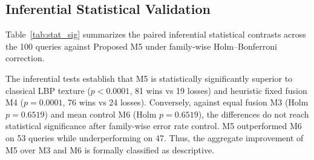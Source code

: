 \documentclass[pdflatex,sn-mathphys-num]{sn-jnl}
\renewenvironment{table}[1][]{%
  \begin{tableorg}[#1]%
  \centering
}{%
  \end{tableorg}%
}
\begin{document}
\subsection{Inferential Statistical Validation}
Table~\ref{tab:stat_sig} summarizes the paired inferential statistical contrasts across the 100 queries against Proposed M5 under family-wise Holm--Bonferroni correction.

\begin{table}[htbp]
\centering
\caption{Paired inferential statistical contrasts against Proposed M5 across 100 queries under Holm--Bonferroni correction}\label{tab:stat_sig}
\vspace{2mm}
\renewcommand{\arraystretch}{1.25}
\end{table}

The inferential tests establish that M5 is statistically significantly superior to classical LBP texture ($p < 0.0001$, 81 wins vs 19 losses) and heuristic fixed fusion M4 ($p = 0.0001$, 76 wins vs 24 losses). Conversely, against equal fusion M3 (Holm $p = 0.6519$) and mean control M6 (Holm $p = 0.6519$), the differences do not reach statistical significance after family-wise error rate control. M5 outperformed M6 on 53 queries while underperforming on 47. Thus, the aggregate improvement of M5 over M3 and M6 is formally classified as descriptive.
\end{document}
